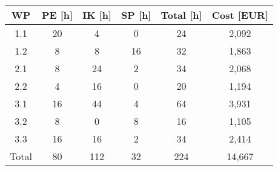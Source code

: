 \documentclass[BCOR=1cm,12pt,bibliography=totoc]{article}
\begin{document}
\begin{tabular}[h]{c|cccc|c}
 WP& PE [h] & IK [h] & SP [h] & Total [h] & Cost [EUR] \\
\hline
1.1&	20&	4&	0&	24&	2,092 \\
1.2&	8&	8&	16&	32&	1,863  \\
2.1&	8&	24&	2&	34&	2,068 \\
2.2&	4&	16&	0&	20&	1,194 \\
3.1&	16&	44&	4&	64&	3,931 \\
3.2&	8&	0&	8&	16&	1,105 \\
  3.3&	16&	16&	2&	34&	2,414 \\
  \hline
Total&	80&	112&32&	224& 14,667 \\

\end{tabular}


\newpage
{\footnotesize
 }



\end{document}
